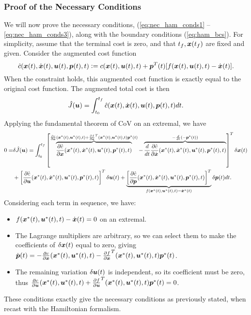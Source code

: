 \subsubsection{Proof of the Necessary Conditions}

We will now prove the necessary conditions, (\ref{eq:nec_ham_conds1} -- \ref{eq:nec_ham_conds3}), along with the boundary conditions (\ref{eq:ham_bcs}). For simplicity, assume that the terminal cost is zero, and that $t_f, \bm{x}(t_f)$ are fixed and given. Consider the augmented cost function 
\begin{equation}
\hat{c}(\bm{x}(t), \dot{\bm{x}}(t), \bm{u}(t), \bm{p}(t),t) \vcentcolon= c(\bm{x}(t),\bm{u}(t),t) + \bm{p}^T(t) [f(\bm{x}(t),\bm{u}(t),t) - \dot{\bm{x}}(t)].
\end{equation}
When the constraint holds, this augmented cost function is exactly equal to the original cost function. The augmented total cost is then
\begin{equation}
    \hat{J}(\bm{u}) = \int_{t_0}^{t_f} \hat{c}(\bm{x}(t), \dot{\bm{x}}(t), \bm{u}(t), \bm{p}(t),t) dt.
\end{equation}
Applying the fundamental theorem of CoV on an extremal, we have
\begin{align}
    0 = &\delta \hat{J}(\bm{u}) = \int_{t_0}^{t_f} \left[ \overbrace{\frac{\partial \hat{c}}{\partial \bm{x}}(\bm{x}^*(t), \dot{\bm{x}}^*(t), \bm{u}^*(t), \bm{p}^*(t),t)}^{\frac{\partial c}{\partial \bm{x}}(\bm{x}^*(t),  \bm{u}^*(t), t) + \frac{\partial f}{\partial \bm{x}}^T(\bm{x}^*(t),  \bm{u}^*(t), t)\bm{p}^*(t)} - \overbrace{\frac{d}{dt} \frac{\partial \hat{c}}{\partial \dot{\bm{x}}}(\bm{x}^*(t), \dot{\bm{x}}^*(t), \bm{u}^*(t), \bm{p}^*(t),t)}^{-\frac{d}{dt}(-\bm{p}^*(t))} \right]^T \delta \bm{x}(t) \\
    & + \left[ \frac{\partial \hat{c}}{\partial \bm{u}}(\bm{x}^*(t), \dot{\bm{x}}^*(t), \bm{u}^*(t), \bm{p}^*(t),t)\right]^T \delta \bm{u}(t) + \underbrace{\left[\frac{\partial \hat{c}}{\partial \bm{p}}(\bm{x}^*(t), \dot{\bm{x}}^*(t), \bm{u}^*(t), \bm{p}^*(t),t) \right]^T }_{f(\bm{x}^*(t),\bm{u}^*(t),t) - \dot{\bm{x}}^*(t)} \delta \bm{p}(t) dt \nonumber.
\end{align}
Considering each term in sequence, we have:
\begin{itemize}
    \item $f(\bm{x}^*(t),\bm{u}^*(t),t) - \dot{\bm{x}}(t) = 0$ on an extremal.
    \item The Lagrange multipliers are arbitrary, so we can select them to make the coefficients of $\delta \bm{x}(t)$ equal to zero, giving $\dot{\bm{p}}(t) = -\frac{\partial c}{\partial \bm{x}}(\bm{x}^*(t),  \bm{u}^*(t), t) - \frac{\partial f}{\partial \bm{x}}^T(\bm{x}^*(t),  \bm{u}^*(t), t)\bm{p}^*(t)$.
    \item The remaining variation $\delta \bm{u}(t)$ is independent, so its coefficient must be zero, thus $ \frac{\partial c}{\partial \bm{u}}(\bm{x}^*(t),  \bm{u}^*(t), t) + \frac{\partial f}{\partial \bm{u}}^T(\bm{x}^*(t),  \bm{u}^*(t), t)\bm{p}^*(t) = 0$.
\end{itemize}
These conditions exactly give the necessary conditions as previously stated, when recast with the Hamiltonian formalism.

